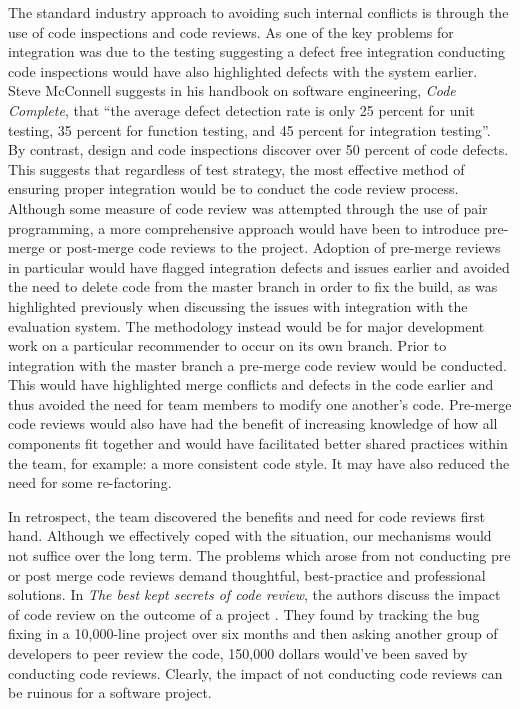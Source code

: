 \documentclass{l3proj}
\begin{document}
The standard industry approach to avoiding such internal conflicts is through the use of code inspections and code reviews. As one of the key problems for integration was due to the testing suggesting a defect free integration conducting code inspections would have also highlighted defects with the system earlier. Steve McConnell suggests in his handbook on software engineering, \textit{Code Complete}, that ``the average defect detection rate is only 25 percent for unit testing, 35 percent for function testing, and 45 percent for integration testing''\cite{CodeComplete}. By contrast, design and code inspections discover over 50 percent of code defects. This suggests that regardless of test strategy, the most effective method of ensuring proper integration would be to conduct the code review process. Although some measure of code review was attempted through the use of pair programming, a more comprehensive approach would have been to introduce pre-merge or post-merge code reviews to the project. Adoption of pre-merge reviews in particular would have flagged integration defects and issues earlier and avoided the need to delete code from the master branch in order to fix the build, as was highlighted previously when discussing the issues with integration with the evaluation system. The methodology instead would be for major development work on a particular recommender to occur on its own branch. Prior to integration with the master branch a pre-merge code review would be conducted. This would have highlighted merge conflicts and defects in the code earlier and thus avoided the need for team members to modify one another's code. Pre-merge code reviews would also have had the benefit of increasing knowledge of how all components fit together and would have facilitated better shared practices within the team, for example: a more consistent code style. It may have also reduced the need for some re-factoring.

In retrospect, the team discovered the benefits and need for code reviews first hand. Although we effectively coped with the situation, our mechanisms would not suffice over the long term. The problems which arose from not conducting pre or post merge code reviews demand thoughtful, best-practice and professional solutions. In \textit{The best kept secrets of code review}, the authors discuss the impact of code review on the outcome of a project \cite{CodeReview}. They found by tracking the bug fixing in a 10,000-line project over six months and then asking another group of developers to peer review the code, 150,000 dollars would've been saved by conducting code reviews. Clearly, the impact of not conducting code reviews can be ruinous for a software project. 
\end{document}

